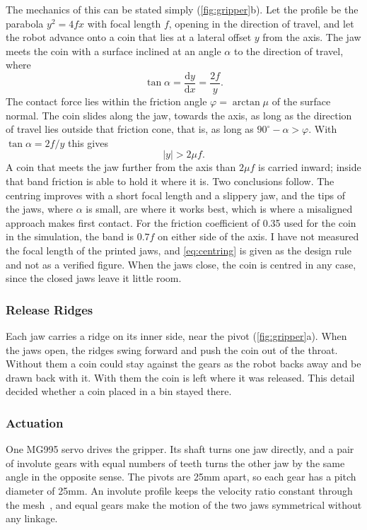 The mechanics of this can be stated simply (\cref{fig:gripper}b). Let the profile be the
parabola $y^2=4fx$ with focal length $f$, opening in the direction of travel, and let the
robot advance onto a coin that lies at a lateral offset $y$ from the axis. The jaw meets the
coin with a surface inclined at an angle $\alpha$ to the direction of travel, where
\begin{equation}
  \tan\alpha = \frac{\mathrm{d}y}{\mathrm{d}x} = \frac{2f}{y}.
\end{equation}
The contact force lies within the friction angle $\varphi=\arctan\mu$ of the surface normal.
The coin slides along the jaw, towards the axis, as long as the direction of travel lies
outside that friction cone, that is, as long as $90^\circ-\alpha>\varphi$. With
$\tan\alpha=2f/y$ this gives
\begin{equation}
  \lvert y\rvert > 2\mu f .
  \label{eq:centring}
\end{equation}
A coin that meets the jaw further from the axis than $2\mu f$ is carried inward; inside
that band friction is able to hold it where it is. Two conclusions follow. The centring
improves with a short focal length and a slippery jaw, and the tips of the jaws, where
$\alpha$ is small, are where it works best, which is where a misaligned approach makes
first contact. For the friction coefficient of 0.35 used for the coin in the simulation, the
band is $0.7f$ on either side of the axis. I have not measured the focal length of the
printed jaws, and \cref{eq:centring} is given as the design rule and not as a verified
figure. When the jaws close, the coin is centred in any case, since the closed jaws leave it
little room.

\subsubsection{Release Ridges}
Each jaw carries a ridge on its inner side, near the pivot (\cref{fig:gripper}a). When the
jaws open, the ridges swing forward and push the coin out of the throat. Without them a coin
could stay against the gears as the robot backs away and be drawn back with it. With them
the coin is left where it was released. This detail decided whether a coin placed in a bin
stayed there.

\subsubsection{Actuation}
One MG995 servo drives the gripper. Its shaft turns one jaw directly, and a pair of involute
gears with equal numbers of teeth turns the other jaw by the same angle in the opposite
sense. The pivots are 25\unit{mm} apart, so each gear has a pitch diameter of 25\unit{mm}.
An involute profile keeps the velocity ratio constant through the mesh~\cite{shigley},
and equal gears make the motion of the two jaws symmetrical without any linkage.

